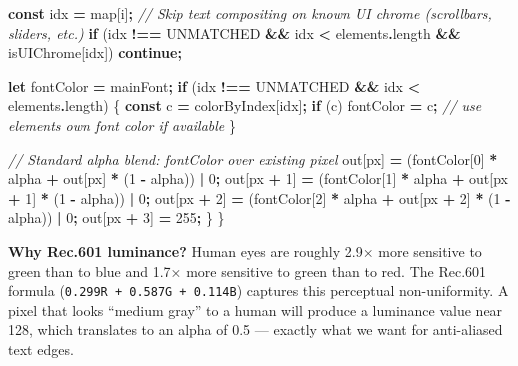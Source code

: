 \documentclass[
  11pt,
  oneside]{report}
\newenvironment{Shaded}{\begin{snugshade}}{\end{snugshade}}
\newcommand{\AttributeTok}[1]{\textcolor[rgb]{0.13,0.29,0.53}{#1}}
\newcommand{\CommentTok}[1]{\textcolor[rgb]{0.56,0.35,0.01}{\textit{#1}}}
\newcommand{\ControlFlowTok}[1]{\textcolor[rgb]{0.13,0.29,0.53}{\textbf{#1}}}
\newcommand{\DecValTok}[1]{\textcolor[rgb]{0.00,0.00,0.81}{#1}}
\newcommand{\KeywordTok}[1]{\textcolor[rgb]{0.13,0.29,0.53}{\textbf{#1}}}
\newcommand{\NormalTok}[1]{#1}
\newcommand{\OperatorTok}[1]{\textcolor[rgb]{0.81,0.36,0.00}{\textbf{#1}}}
\begin{document}
\begin{Shaded}
\begin{Highlighting}[]
    \KeywordTok{const}\NormalTok{ idx }\OperatorTok{=}\NormalTok{ map[i]}\OperatorTok{;}
    \CommentTok{// Skip text compositing on known UI chrome (scrollbars, sliders, etc.)}
    \ControlFlowTok{if}\NormalTok{ (idx }\OperatorTok{!==}\NormalTok{ UNMATCHED }\OperatorTok{\&\&}\NormalTok{ idx }\OperatorTok{\textless{}}\NormalTok{ elements}\OperatorTok{.}\AttributeTok{length} \OperatorTok{\&\&}\NormalTok{ isUIChrome[idx]) }\ControlFlowTok{continue}\OperatorTok{;}

    \KeywordTok{let}\NormalTok{ fontColor }\OperatorTok{=}\NormalTok{ mainFont}\OperatorTok{;}
    \ControlFlowTok{if}\NormalTok{ (idx }\OperatorTok{!==}\NormalTok{ UNMATCHED }\OperatorTok{\&\&}\NormalTok{ idx }\OperatorTok{\textless{}}\NormalTok{ elements}\OperatorTok{.}\AttributeTok{length}\NormalTok{) \{}
      \KeywordTok{const}\NormalTok{ c }\OperatorTok{=}\NormalTok{ colorByIndex[idx]}\OperatorTok{;}
      \ControlFlowTok{if}\NormalTok{ (c) fontColor }\OperatorTok{=}\NormalTok{ c}\OperatorTok{;} \CommentTok{// use element\textquotesingle{}s own font color if available}
\NormalTok{    \}}

    \CommentTok{// Standard alpha blend: fontColor over existing pixel}
\NormalTok{    out[px]     }\OperatorTok{=}\NormalTok{ (fontColor[}\DecValTok{0}\NormalTok{] }\OperatorTok{*}\NormalTok{ alpha }\OperatorTok{+}\NormalTok{ out[px]     }\OperatorTok{*}\NormalTok{ (}\DecValTok{1} \OperatorTok{{-}}\NormalTok{ alpha)) }\OperatorTok{|} \DecValTok{0}\OperatorTok{;}
\NormalTok{    out[px }\OperatorTok{+} \DecValTok{1}\NormalTok{] }\OperatorTok{=}\NormalTok{ (fontColor[}\DecValTok{1}\NormalTok{] }\OperatorTok{*}\NormalTok{ alpha }\OperatorTok{+}\NormalTok{ out[px }\OperatorTok{+} \DecValTok{1}\NormalTok{] }\OperatorTok{*}\NormalTok{ (}\DecValTok{1} \OperatorTok{{-}}\NormalTok{ alpha)) }\OperatorTok{|} \DecValTok{0}\OperatorTok{;}
\NormalTok{    out[px }\OperatorTok{+} \DecValTok{2}\NormalTok{] }\OperatorTok{=}\NormalTok{ (fontColor[}\DecValTok{2}\NormalTok{] }\OperatorTok{*}\NormalTok{ alpha }\OperatorTok{+}\NormalTok{ out[px }\OperatorTok{+} \DecValTok{2}\NormalTok{] }\OperatorTok{*}\NormalTok{ (}\DecValTok{1} \OperatorTok{{-}}\NormalTok{ alpha)) }\OperatorTok{|} \DecValTok{0}\OperatorTok{;}
\NormalTok{    out[px }\OperatorTok{+} \DecValTok{3}\NormalTok{] }\OperatorTok{=} \DecValTok{255}\OperatorTok{;}
\NormalTok{  \}}
\NormalTok{\}}
\end{Highlighting}
\end{Shaded}

\textbf{Why Rec.601 luminance?} Human eyes are roughly 2.9× more
sensitive to green than to blue and 1.7× more sensitive to green than to
red. The Rec.601 formula (\texttt{0.299R\ +\ 0.587G\ +\ 0.114B})
captures this perceptual non-uniformity. A pixel that looks ``medium
gray'' to a human will produce a luminance value near 128, which
translates to an alpha of 0.5 --- exactly what we want for anti-aliased
text edges.
\end{document}
